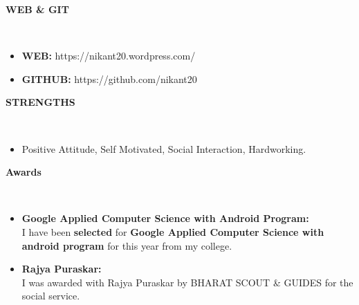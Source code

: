 \documentclass[a4paper,10pt]{article}
\newcommand{\lsep}{-0.5cm}
\newcommand{\resheading}[1]{{\small \colorbox{mygrey}{\begin{minipage}{0.975\textwidth}{\textbf{#1 \vphantom{p\^{E}}}}\end{minipage}}}}
\begin{document}
\resheading{\textbf{WEB \& GIT} }\\[\lsep]
\begin{itemize}
	\item \textbf{\small WEB:}  https://nikant20.wordpress.com/
	\item \textbf{\small GITHUB:} https://github.com/nikant20
\end{itemize}

\resheading{\textbf{STRENGTHS} }\\[\lsep]
\begin{itemize}
\item \noindent Positive Attitude, Self Motivated, Social Interaction, Hardworking.

\end{itemize}

\resheading{\textbf{Awards} }\\[\lsep]
\begin{itemize}
\item \noindent \textbf{Google Applied Computer Science with Android Program:}\\
I have been \textbf{selected} for \textbf{Google Applied Computer Science with android program} for this year from my college.
\item \noindent \textbf{Rajya Puraskar:}\\
I was awarded with Rajya Puraskar by BHARAT SCOUT \& GUIDES for the social service. 

\end{itemize}
\end{document}

